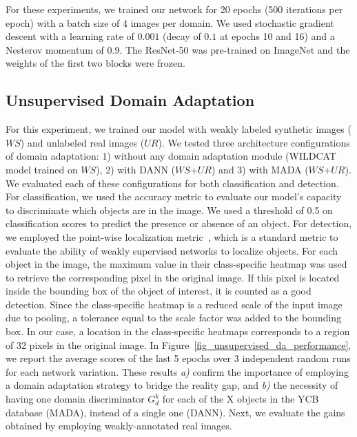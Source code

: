\documentclass[letterpaper, 10 pt, conference]{ieeeconf}  %
\newcommand{\jp}[1]{\textcolor{orange}{#1}}
\begin{document}
For these experiments, we trained our network for 20 epochs (500 iterations per epoch) with a batch size of 4 images per domain. We used stochastic gradient descent with a learning rate of $0.001$ (decay of $0.1$ at epochs 10 and 16) and a Nesterov momentum of $0.9$. The ResNet-50 was pre-trained on ImageNet and the weights of the first two blocks were frozen.

\subsection{Unsupervised Domain Adaptation}\label{UnsupervisedDA}
For this experiment, we trained our model with weakly labeled synthetic images ($WS$) and unlabeled real images ($UR$). %
We tested three architecture configurations of domain adaptation: 1) without any domain adaptation module (WILDCAT model trained on $WS$), 2) with DANN ($WS$+$UR$) and 3) with MADA ($WS$+$UR$). We evaluated each of these configurations for both classification and detection. For classification, we used the accuracy metric to evaluate our model's capacity to discriminate which objects are in the image. We used a threshold of 0.5 on classification scores to predict the presence or absence of an object. For detection, we employed the point-wise localization metric~\cite{oquab2015object}, which is a standard metric to evaluate the ability of weakly supervised networks to localize objects. For each object in the image, the maximum value in their class-specific heatmap was used to retrieve the corresponding pixel in the original image. If this pixel is located inside the bounding box of the object of interest, it is counted as a good detection. Since the class-specific heatmap is a reduced scale of the input image due to pooling, a tolerance equal to the scale factor was added to the bounding box. In our case, a location in the class-specific heatmaps corresponds to a region of 32 pixels in the original image.
In Figure~\ref{fig_unsupervised_da_performance}, we report the average scores of the last 5 epochs over 3 independent random runs for each network variation. %
These results \emph{a)} confirm the importance of employing a domain adaptation strategy to bridge the reality gap, and \emph{b)} the necessity of having one domain discriminator $G_d^k$ for each of the X objects in the YCB database (MADA), instead of a single one (DANN). Next, we evaluate the gains obtained by employing weakly-annotated real images.
\end{document}
